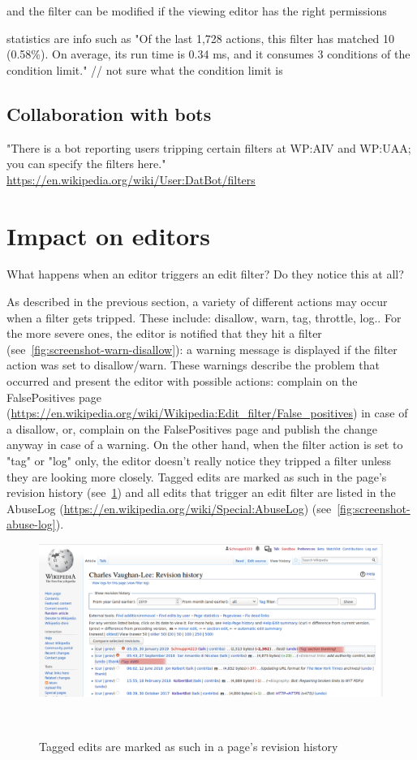 \documentclass{sigchi}
\begin{document}
and the filter can be modified if the viewing editor has the right permissions

statistics are info such as "Of the last 1,728 actions, this filter has matched 10 (0.58\%). On average, its run time is 0.34 ms, and it consumes 3 conditions of the condition limit." // not sure what the condition limit is

\subsection{Collaboration with bots}

"There is a bot reporting users tripping certain filters at WP:AIV and WP:UAA; you can specify the filters here."
\url{https://en.wikipedia.org/wiki/User:DatBot/filters}



\section{Impact on editors}

What happens when an editor triggers an edit filter? Do they notice this at all?

As described in the previous section, a variety of different actions may occur when a filter gets tripped.
These include: disallow, warn, tag, throttle, log..
For the more severe ones, the editor is notified that they hit a filter (see~\ref{fig:screenshot-warn-disallow}):
a warning message is displayed if the filter action was set to disallow/warn.
These warnings describe the problem that occurred and present the editor with possible actions:
complain on the FalsePositives page (\url{https://en.wikipedia.org/wiki/Wikipedia:Edit_filter/False_positives}) in case of a disallow,
or, complain on the FalsePositives page and publish the change anyway in case of a warning.
On the other hand, when the filter action is set to "tag" or "log" only, the editor doesn't really notice they tripped a filter unless they are looking more closely.
Tagged edits are marked as such in the page's revision history (see~\ref{fig:tags-in-history})
and all edits that trigger an edit filter are listed in the AbuseLog (\url{https://en.wikipedia.org/wiki/Special:AbuseLog}) (see~\ref{fig:screenshot-abuse-log}).

\begin{figure}
\centering
  \includegraphics[width=0.9\columnwidth]{figures/screenshots-filter-trigger/Screenshot-tags-in-revision-history.png}
  \caption{Tagged edits are marked as such in a page's revision history}~\label{fig:tags-in-history}
\end{figure}
\end{document}
